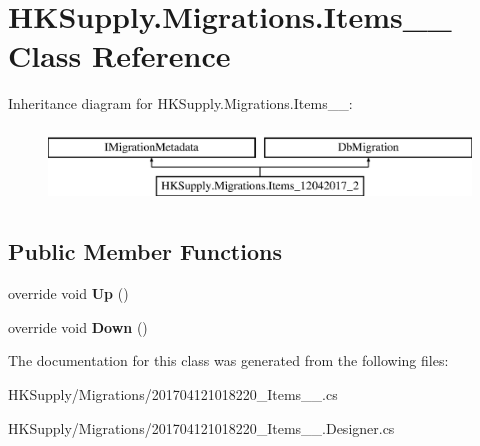 \hypertarget{class_h_k_supply_1_1_migrations_1_1_items__12042017__2}{}\section{H\+K\+Supply.\+Migrations.\+Items\+\_\+\_ Class Reference}
\label{class_h_k_supply_1_1_migrations_1_1_items__12042017__2}
Inheritance diagram for H\+K\+Supply.\+Migrations.\+Items\+\_\+\_\+:\begin{figure}[H]
\begin{center}
\leavevmode
\includegraphics[height=2.000000cm]{class_h_k_supply_1_1_migrations_1_1_items__12042017__2}
\end{center}
\end{figure}
\subsection*{Public Member Functions}
\begin{DoxyCompactItemize}
\item 
\mbox{\label{class_h_k_supply_1_1_migrations_1_1_items__12042017__2_af6a30f43b5747f578a7a227ebf98d414}} 
override void {\bfseries Up} ()
\item 
\mbox{\label{class_h_k_supply_1_1_migrations_1_1_items__12042017__2_a9e1e15b6c9e31d050e70e6f97ab7dc28}} 
override void {\bfseries Down} ()
\end{DoxyCompactItemize}


The documentation for this class was generated from the following files\+:\begin{DoxyCompactItemize}
\item 
H\+K\+Supply/\+Migrations/201704121018220\+\_\+\+Items\+\_\+\_.\+cs\item 
H\+K\+Supply/\+Migrations/201704121018220\+\_\+\+Items\+\_\+\_.\+Designer.\+cs\end{DoxyCompactItemize}
